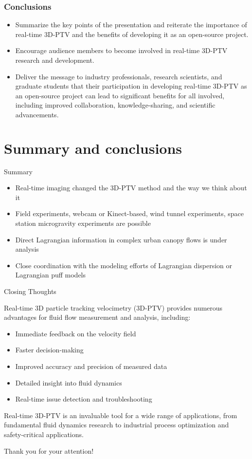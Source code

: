 \documentclass[aspectratio=43]{beamer}
\begin{document}
\begin{frame}
\frametitle{Conclusions}
\begin{itemize}
\item Summarize the key points of the presentation and reiterate the importance of real-time 3D-PTV and the benefits of developing it as an open-source project.
\item Encourage audience members to become involved in real-time 3D-PTV research and development.
\item Deliver the message to industry professionals, research scientists, and graduate students that their participation in developing real-time 3D-PTV as an open-source project can lead to significant benefits for all involved, including improved collaboration, knowledge-sharing, and scientific advancements.
\end{itemize}
\end{frame}




\section{Summary and conclusions}\label{sec:summary}

\begin{frame}{Summary}
\begin{itemize}
\item Real-time imaging changed the 3D-PTV method and the way we think about it
\item Field experiments, webcam or Kinect-based, wind tunnel experiments, space station microgravity experiments are possible
\item Direct Lagrangian information in complex urban canopy flows is under analysis
\item Close coordination with the modeling efforts of Lagrangian dispersion or Lagrangian puff models
\end{itemize}
\end{frame}



\begin{frame}{Closing Thoughts}

Real-time 3D particle tracking velocimetry (3D-PTV) provides numerous advantages for fluid flow measurement and analysis, including:

\begin{itemize}
\item Immediate feedback on the velocity field
\item Faster decision-making
\item Improved accuracy and precision of measured data
\item Detailed insight into fluid dynamics
\item Real-time issue detection and troubleshooting
\end{itemize}

Real-time 3D-PTV is an invaluable tool for a wide range of applications, from fundamental fluid dynamics research to industrial process optimization and safety-critical applications.

\bigskip
Thank you for your attention!

\end{frame}
\end{document}
